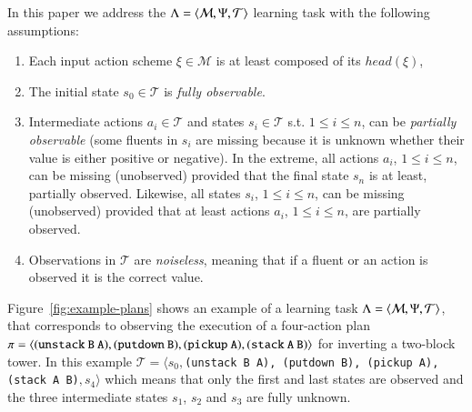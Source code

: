 In this paper we address the $\Lambda={\langle \mathcal{M},\Psi,\mathcal{T} \rangle}$ learning task with the following assumptions:
\begin{enumerate}
\item Each input action scheme $\xi\in\mathcal{M}$ is at least composed of its $head(\xi)$,
\item The initial state $s_0\in\mathcal{T}$ is {\em fully observable}.
\item Intermediate actions $a_i\in\mathcal{T}$ and states $s_i\in\mathcal{T}$ s.t. {\small $1\leq i\leq n$}, can be {\em partially observable} (some fluents in $s_i$ are missing because it is unknown whether their value is either positive or negative). In the extreme, all actions $a_i$, {\small $1\leq i\leq n$}, can be missing (unobserved) provided that the final state $s_n$ is at least, partially observed. Likewise, all states $s_i$, {\small $1\leq i\leq n$}, can be missing (unobserved) provided that at least actions $a_i$, {\small $1\leq i\leq n$}, are partially observed.
 \item Observations in $\mathcal{T}$ are {\em noiseless}, meaning that if a fluent or an action is observed it is the correct value. 
\end{enumerate}
Figure~\ref{fig:example-plans} shows an example of a learning task $\Lambda={\langle \mathcal{M},\Psi,\mathcal{T} \rangle}$, that corresponds to observing the execution of a four-action plan $\pi={\langle \small\tt (unstack\ B\ A), (putdown\ B), (pickup\ A), (stack\ A\ B) \rangle}$ for inverting a two-block tower. In this example $\mathcal{T}=\langle s_0,${\small\tt (unstack\ B\ A), (putdown\ B), (pickup\ A), (stack\ A\ B)}$,s_4\rangle$ which means that only the first and last states are observed and the three intermediate states $s_1$, $s_2$ and $s_3$ are fully unknown. 

